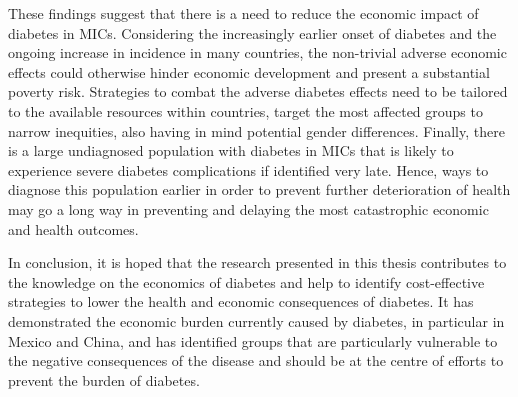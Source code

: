 These findings suggest that there is a need to reduce the economic impact of diabetes in \acp{MIC}. Considering the increasingly earlier onset of diabetes and the ongoing increase in incidence in many countries, the non-trivial adverse economic effects could otherwise hinder economic development and present a substantial poverty risk. Strategies to combat the adverse diabetes effects need to be tailored to the available resources within countries, target the most affected groups to narrow inequities, also having in mind potential gender differences. Finally, there is a large undiagnosed population with diabetes in \acp{MIC} that is likely to experience severe diabetes complications if identified very late. Hence, ways to diagnose this population earlier in order to prevent further deterioration of health may go a long way in preventing and delaying the most catastrophic economic and health outcomes.

In conclusion, it is hoped that the research presented in this thesis contributes to the knowledge on the economics of diabetes and help to identify cost-effective strategies to lower the health and economic consequences of diabetes. It has demonstrated the economic burden currently caused by diabetes, in particular in Mexico and China, and has identified groups that are particularly vulnerable to the negative consequences of the disease and should be at the centre of efforts to prevent the burden of diabetes.